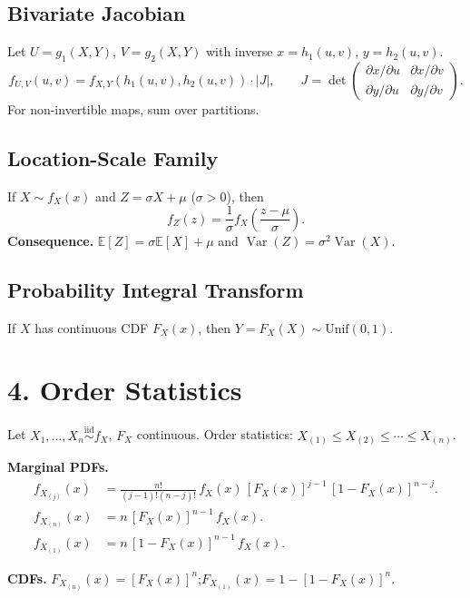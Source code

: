 \documentclass[11pt]{article}
\newcommand{\bbE}{\mathbb{E}}
\newcommand{\Var}{\operatorname{Var}}
\begin{document}
\subsection*{Bivariate Jacobian}

Let $U=g_1(X,Y)$, $V=g_2(X,Y)$ with inverse $x=h_1(u,v)$, $y=h_2(u,v)$.
\[
  f_{U,V}(u,v) = f_{X,Y}(h_1(u,v),h_2(u,v))\cdot|J|,\qquad
  J=\det
  \begin{pmatrix}\partial x/\partial u & \partial x/\partial
    v\\ \partial y/\partial u & \partial y/\partial v
  \end{pmatrix}.
\]
For non-invertible maps, sum over partitions.

\subsection*{Location-Scale Family}

If $X\sim f_X(x)$ and $Z=\sigma X+\mu$ ($\sigma>0$), then
\[
  f_Z(z)=\frac{1}{\sigma}f_X\!\left(\frac{z-\mu}{\sigma}\right).
\]
\textbf{Consequence.} $\bbE[Z]=\sigma\bbE[X]+\mu$ and $\Var(Z)=\sigma^2\Var(X)$.

\subsection*{Probability Integral Transform}

If $X$ has continuous CDF $F_X(x)$, then $Y=F_X(X)\sim\mathrm{Unif}(0,1)$.

\section*{4.\; Order Statistics}

Let $X_1,\ldots,X_n\overset{\mathrm{iid}}{\sim}f_X$, $F_X$ continuous.
Order statistics: $X_{(1)}\leq X_{(2)}\leq\cdots\leq X_{(n)}$.

\medskip
\noindent\textbf{Marginal PDFs.}
\begin{align*}
  f_{X_{(j)}}(x) &=
  \frac{n!}{(j-1)!(n-j)!}\,f_X(x)\,[F_X(x)]^{j-1}\,[1-F_X(x)]^{n-j}. \\[4pt]
  f_{X_{(n)}}(x) &= n\,[F_X(x)]^{n-1}\,f_X(x). \\[4pt]
  f_{X_{(1)}}(x) &= n\,[1-F_X(x)]^{n-1}\,f_X(x).
\end{align*}

\noindent\textbf{CDFs.}
$F_{X_{(n)}}(x)=[F_X(x)]^n$;\quad $F_{X_{(1)}}(x)=1-[1-F_X(x)]^n$.
\end{document}
